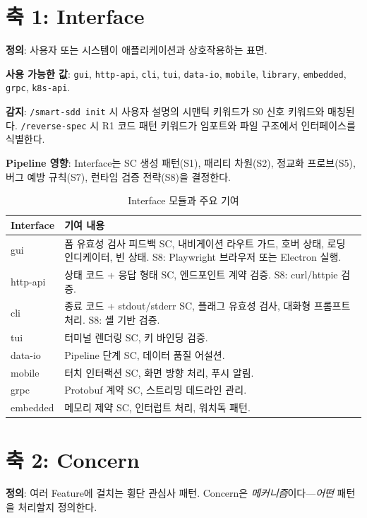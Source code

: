 \documentclass[11pt,a4paper,openright,twoside]{report}
\newcommand{\cmd}[1]{\texttt{/#1}}
\begin{document}
\section{축 1: Interface}

\textbf{정의}: 사용자 또는 시스템이 애플리케이션과 상호작용하는 표면.

\textbf{사용 가능한 값}: \texttt{gui}, \texttt{http-api}, \texttt{cli}, \texttt{tui}, \texttt{data-io}, \texttt{mobile}, \texttt{library}, \texttt{embedded}, \texttt{grpc}, \texttt{k8s-api}.

\textbf{감지}: \cmd{smart-sdd init} 시 사용자 설명의 시맨틱 키워드가 S0 신호 키워드와 매칭된다. \cmd{reverse-spec} 시 R1 코드 패턴 키워드가 임포트와 파일 구조에서 인터페이스를 식별한다.

\textbf{Pipeline 영향}: Interface는 SC 생성 패턴(S1), 패리티 차원(S2), 정교화 프로브(S5), 버그 예방 규칙(S7), 런타임 검증 전략(S8)을 결정한다.

\begin{table}[H]
\centering
\caption{Interface 모듈과 주요 기여}
\label{tab:interfaces}
\begin{tabularx}{\textwidth}{lX}
\toprule
\textbf{Interface} & \textbf{기여 내용} \\
\midrule
gui & 폼 유효성 검사 피드백 SC, 내비게이션 라우트 가드, 호버 상태, 로딩 인디케이터, 빈 상태. S8: Playwright 브라우저 또는 Electron 실행. \\
http-api & 상태 코드 + 응답 형태 SC, 엔드포인트 계약 검증. S8: curl/httpie 검증. \\
cli & 종료 코드 + stdout/stderr SC, 플래그 유효성 검사, 대화형 프롬프트 처리. S8: 셸 기반 검증. \\
tui & 터미널 렌더링 SC, 키 바인딩 검증. \\
data-io & Pipeline 단계 SC, 데이터 품질 어설션. \\
mobile & 터치 인터랙션 SC, 화면 방향 처리, 푸시 알림. \\
grpc & Protobuf 계약 SC, 스트리밍 데드라인 관리. \\
embedded & 메모리 제약 SC, 인터럽트 처리, 워치독 패턴. \\
\bottomrule
\end{tabularx}
\end{table}

\section{축 2: Concern}

\textbf{정의}: 여러 Feature에 걸치는 횡단 관심사 패턴. Concern은 \emph{메커니즘}이다---\emph{어떤} 패턴을 처리할지 정의한다.
\end{document}
